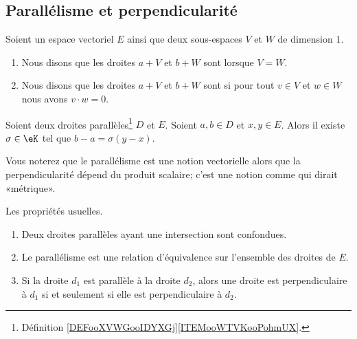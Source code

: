\subsection{Parallélisme et perpendicularité}


\begin{definition}		\label{DEFooXVWGooIDYXGj}
	Soient un espace vectoriel \( E\) ainsi que deux sous-espaces \( V\) et \( W\) de dimension \( 1\).
	\begin{enumerate}
		\item		\label{ITEMooWTVKooPohmUX}
		      Nous disons que les droites \( a+V\) et \( b+W\) sont  lorsque \( V=W\).
		\item
		      Nous disons que les droites \( a+V\) et \( b+W\) sont  si pour tout \( v\in V\) et \( w\in W\) nous avons \( v\cdot w=0\).
	\end{enumerate}
\end{definition}

\begin{proposition}	\label{PROPooZMVZooSRwCLT}
	Soient deux droites parallèles\footnote{Définition \ref{DEFooXVWGooIDYXGj}\ref{ITEMooWTVKooPohmUX}.} \( D\) et \( E\). Soient \( a,b\in D\) et \( x,y\in E\). Alors il existe \( \sigma\in \eK\) tel que \( b-a=\sigma(y-x)\).
\end{proposition}


Vous noterez que le parallélisme est une notion vectorielle alors que la perpendicularité dépend du produit scalaire; c'est une notion comme qui dirait «métrique».

\begin{proposition}     \label{PROPooADJNooMyXUxG}
	Les propriétés usuelles.
	\begin{enumerate}
		\item		\label{ITEMooSXVYooBUvvxj}
		      Deux droites parallèles ayant une intersection sont confondues.
		\item
		      Le parallélisme est une relation d'équivalence sur l'ensemble des droites de \( E\).
		\item
		      Si la droite \( d_1\) est parallèle à la droite \( d_2\), alors une droite est perpendiculaire à \( d_1\) si et seulement si elle est perpendiculaire à \( d_2\).
	\end{enumerate}
\end{proposition}

